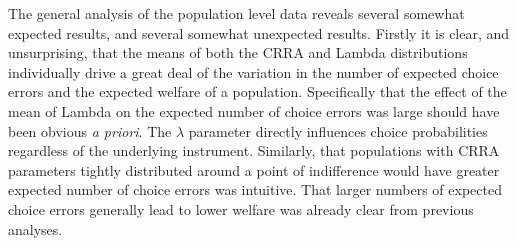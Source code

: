 \documentclass[../main.tex]{subfiles}
\begin{document}
%
%
%

The general analysis of the population level data reveals several somewhat expected results, and several somewhat unexpected results.
Firstly it is clear, and unsurprising, that the means of both the CRRA and Lambda distributions individually drive a great deal of the variation in the number of expected choice errors and the expected welfare of a population.
Specifically that the effect of the mean of Lambda on the expected number of choice errors was large should have been obvious \textit{a priori}.
The $\lambda$ parameter directly influences choice probabilities regardless of the underlying instrument.
Similarly, that populations with CRRA parameters tightly distributed around a point of indifference would have greater expected number of choice errors was intuitive.
That larger numbers of expected choice errors generally lead to lower welfare was already clear from previous analyses.
\end{document}
